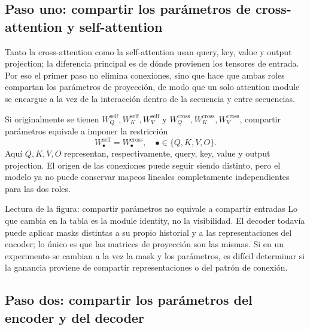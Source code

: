 \subsection{Paso uno: compartir los parámetros de cross-attention y self-attention}

Tanto la cross-attention como la self-attention usan query, key, value y output projection; la diferencia principal es de dónde provienen los tensores de entrada. Por eso el primer paso no elimina conexiones, sino que hace que ambas roles compartan los parámetros de proyección, de modo que un solo attention module se encargue a la vez de la interacción dentro de la secuencia y entre secuencias.


Si originalmente se tienen $W_Q^{\mathrm{self}},W_K^{\mathrm{self}},W_V^{\mathrm{self}}$ y $W_Q^{\mathrm{cross}},W_K^{\mathrm{cross}},W_V^{\mathrm{cross}}$, compartir parámetros equivale a imponer la restricción
\[
W_{\bullet}^{\mathrm{self}}=W_{\bullet}^{\mathrm{cross}},
\quad \bullet\in\{Q,K,V,O\}.
\]
Aquí $Q,K,V,O$ representan, respectivamente, query, key, value y output projection. El origen de las conexiones puede seguir siendo distinto, pero el modelo ya no puede conservar mapeos lineales completamente independientes para las dos roles.


\begin{knowledgebox}{Lectura de la figura: compartir parámetros no equivale a compartir entradas}
Lo que cambia en la tabla es la module identity, no la visibilidad. El decoder todavía puede aplicar masks distintas a su propio historial y a las representaciones del encoder; lo único es que las matrices de proyección son las mismas. Si en un experimento se cambian a la vez la mask y los parámetros, es difícil determinar si la ganancia proviene de compartir representaciones o del patrón de conexión.
\end{knowledgebox}

\subsection{Paso dos: compartir los parámetros del encoder y del decoder}

